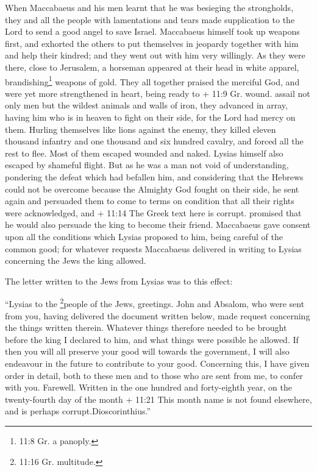  When Maccabaeus and his men learnt that he was besieging
the strongholds, they and all the people with lamentations and tears
made supplication to the Lord to send a good angel to save Israel.
 Maccabaeus himself took up weapons first, and exhorted the
others to put themselves in jeopardy together with him and help their
kindred; and they went out with him very willingly.  As they
were there, close to Jerusalem, a horseman appeared at their head in
white apparel, brandishing\footnote{11:8 Gr. a panoply.} weapons of
gold.  They all together praised the merciful God, and were
yet more strengthened in heart, being ready to + 11:9 Gr. wound. assail
not only men but the wildest animals and walls of iron, 
they advanced in array, having him who is in heaven to fight on their
side, for the Lord had mercy on them.  Hurling themselves
like lions against the enemy, they killed eleven thousand infantry and
one thousand and six hundred cavalry, and forced all the rest to flee.
 Most of them escaped wounded and naked. Lysias himself
also escaped by shameful flight.  But as he was a man not
void of understanding, pondering the defeat which had befallen him, and
considering that the Hebrews could not be overcome because the Almighty
God fought on their side, he sent again  and persuaded them
to come to terms on condition that all their rights were acknowledged,
and + 11:14 The Greek text here is corrupt. promised that he would also
persuade the king to become their friend.  Maccabaeus gave
consent upon all the conditions which Lysias proposed to him, being
careful of the common good; for whatever requests Maccabaeus delivered
in writing to Lysias concerning the Jews the king allowed.

 The letter written to the Jews from Lysias was to this
effect:

``Lysias to the \footnote{11:16 Gr. multitude.}people of the Jews,
greetings.  John and Absalom, who were sent from you,
having delivered the document written below, made request concerning the
things written therein.  Whatever things therefore needed
to be brought before the king I declared to him, and what things were
possible he allowed.  If then you will all preserve your
good will towards the government, I will also endeavour in the future to
contribute to your good.  Concerning this, I have given
order in detail, both to these men and to those who are sent from me, to
confer with you.  Farewell. Written in the one hundred and
forty-eighth year, on the twenty-fourth day of the month + 11:21 This
month name is not found elsewhere, and is perhaps
corrupt.Dioscorinthius.''

